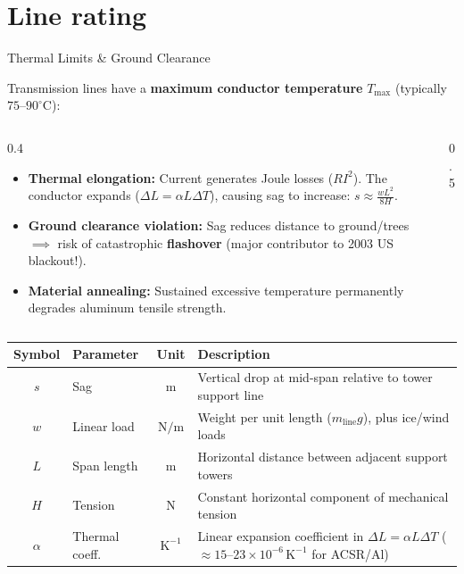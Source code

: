 \section{Line rating}\label{sec:LR}

\begin{frame}[allowframebreaks]{Thermal Limits \& Ground Clearance}

Transmission lines have a \textbf{maximum conductor temperature} $T_{\text{max}}$ (typically $75\text{--}90^\circ\text{C}$):

\begin{columns}[c]
    \begin{column}{0.4\textwidth}
    \footnotesize
    \begin{itemize}\setlength{\itemsep}{2pt}
        \item \textbf{Thermal elongation:} Current generates Joule losses ($R I^2$). The conductor expands ($\Delta L = \alpha L \Delta T$), causing sag to increase: $s \approx \frac{w L^2}{8 H}$.
        \item \textbf{Ground clearance violation:} Sag reduces distance to ground/trees $\implies$ risk of catastrophic \textbf{flashover} (major contributor to 2003 US blackout!).
        \item \textbf{Material annealing:} Sustained excessive temperature permanently degrades aluminum tensile strength.
    \end{itemize}
    \end{column}
    \begin{column}{0.5\textwidth}
        \centering
        
    \end{column}
\end{columns}
\vspace{0.2em}
{\centering
\footnotesize
\begin{tabular}{c l c p{8.2cm}}
    \toprule
    \textbf{Symbol} & \textbf{Parameter} & \textbf{Unit} & \textbf{Description} \\
    \midrule
    $s$ & Sag & $\mathrm{m}$ & Vertical drop at mid-span relative to tower support line \\
    \addlinespace[3pt]
    $w$ & Linear load & $\mathrm{N/m}$ & Weight per unit length ($m_{\text{line}} g$), plus ice/wind loads \\
    \addlinespace[3pt]
    $L$ & Span length & $\mathrm{m}$ & Horizontal distance between adjacent support towers \\
    \addlinespace[3pt]
    $H$ & Tension & $\mathrm{N}$ & Constant horizontal component of mechanical tension \\
    \addlinespace[3pt]
    $\alpha$ & Thermal coeff. & $\mathrm{K}^{-1}$ & Linear expansion coefficient in $\Delta L = \alpha L \Delta T$ ($\approx 15\text{--}23 \times 10^{-6}\,\mathrm{K}^{-1}$ for ACSR/Al) \\
    \bottomrule
\end{tabular}\par}
\end{frame}

